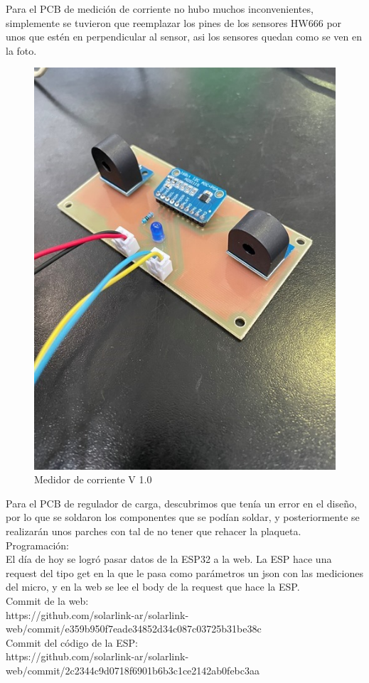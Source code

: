 Para el PCB de medición de corriente no hubo muchos inconvenientes, simplemente se tuvieron que reemplazar los pines de los sensores HW666 por unos que estén en perpendicular al sensor, asi los sensores quedan como se ven en la foto.

\begin{figure}[H]
    \centering
    \includegraphics[width=0.5\linewidth]{informes/IMG_8064.jpg}
    \caption{Medidor de corriente V 1.0}
    
\end{figure}

Para el PCB de regulador de carga, descubrimos que tenía un error en el diseño, por lo que se soldaron los componentes que se podían soldar, y posteriormente se realizarán unos parches con tal de no tener que rehacer la plaqueta.\\

Programación:\\

El día de hoy se logró pasar datos de la ESP32 a la web. La ESP hace una request del tipo get en la que le pasa como parámetros un json con las mediciones del micro, y en la web se lee el body de la request que hace la ESP. \\

Commit de la web:\\
https://github.com/solarlink-ar/solarlink-\\web/commit/e359b950f7eade34852d34c087c03725b31be38c\\

Commit del código de la ESP:\\
https://github.com/solarlink-ar/solarlink-\\web/commit/2c2344c9d0718f6901b6b3c1ce2142ab0febc3aa\\

